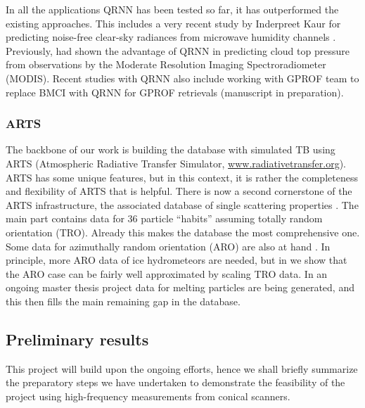 \documentclass[12pt,oneside,a4paper]{article}
\begin{document}

In all the applications QRNN has been tested so far, it has outperformed the existing approaches. This includes a very recent study by Inderpreet Kaur for predicting noise-free clear-sky radiances from microwave humidity channels \citep{kaur:2021:canma}. Previously, \citet{pfreundschuh:aneur:18} had shown the advantage of QRNN in predicting cloud top pressure from observations by the Moderate Resolution Imaging Spectroradiometer (MODIS). Recent studies with QRNN also include working with GPROF team to replace BMCI with QRNN for GPROF retrievals (manuscript in preparation).


\subsubsection{ARTS}
\label{sec:arts}
% 
The backbone of our work is building the database with simulated TB using ARTS (Atmospheric Radiative Transfer Simulator, \url{www.radiativetransfer.org}). ARTS has some unique features, but in this context, it is rather the completeness and flexibility of ARTS that is helpful. There is now a second cornerstone of the ARTS infrastructure, the
associated database of single scattering properties \citep{eriksson:agene:18}.
The main part contains data for 36 particle ``habits'' assuming totally random
orientation (TRO). Already this makes the database the most comprehensive one.
Some data for azimuthally random orientation (ARO) are also at hand
\citep{brath:micro:20,ekelund:micro:20}. In principle, more ARO data of ice
hydrometeors are needed, but in \citet{baralakas:intro:21} we show that the ARO
case can be fairly well approximated by scaling TRO data. In an ongoing master
thesis project data for melting particles are being generated, and this then
fills the main remaining gap in the database.

\subsection{Preliminary results}
%
This project will build upon the ongoing efforts, hence we shall briefly summarize the preparatory steps we have undertaken to demonstrate the feasibility of the project using high-frequency measurements from conical scanners.
\end{document}
